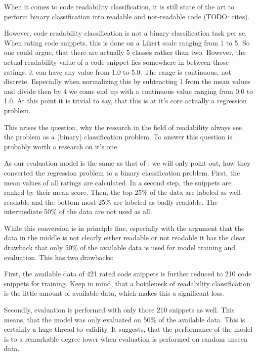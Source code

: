 \documentclass[%
class=scrreprt,
chapterprefix=false,%
open=right,%
twoside=false,%
paper=a4,%
logofile={Logo\_zentral\_farbig\_EN.png},%
thesistype=master,%
UKenglish,%
]{se2thesis}
\begin{document}
	When it comes to code readability classification, it is still state of the art to perform binary classification into readable and not-readable code (TODO: cites). 
	
	However, code readability classification is not a binary classification task per se. When rating code snippets, this is done on a Likert scale ranging from 1 to 5. So one could argue, that there are actually 5 classes rather than two.	
	However, the actual readability value of a code snippet lies somewhere in between those ratings, it can have any value from 1.0 to 5.0.  The range is continuous, not discrete. Especially when normalizing this by subtracting 1 from the mean values and divide then by 4 we come end up with a continuous value ranging from 0.0 to 1.0. At this point it is trivial to say, that this is at it's core actually a regression problem.
	
	This arises the question, why the research in the field of readability always see the problem as a (binary) classification problem. To answer this question is probably worth a research on it's one. 
	
	As our evaluation model is the same as that of \citeauthor{mi2022towards}, we will only point out, how they converted the regression problem to a binary classification problem. First, the mean values of all ratings are calculated. In a second step, the snippets are ranked by their mean score. Then, the top 25\% of the data are labeled as well-readable and the bottom most 25\% are labeled as badly-readable. The intermediate 50\% of the data are not used as all.
	
	While this conversion is in principle fine, especially with the argument that the data in the middle is not clearly either readable or not readable it has the clear drawback that only 50\% of the available data is used for model training and evaluation. This has two drawbacks:
	
	First, the available data of 421 rated code snippets is further reduced to 210 code snippets for training. Keep in mind, that a bottleneck of readability classification is the little amount of available data, which makes this a significant loss.
	
	Secondly, evaluation is performed with only those 210 snippets as well. This means, that the model was only evaluated on 50\% of the available data. This is certainly a huge thread to validity. It suggests, that the performance of the model is to a remarkable degree lower when evaluation is performed on random unseen data.
	
\end{document}
